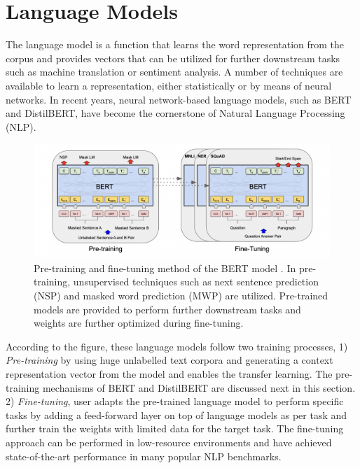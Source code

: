 \documentclass[%
	BCOR=8mm, %
	DIV=12,
	toc=bibliography, %
	toc=listof, %
	oneside, %
	egregdoesnotlikesansseriftitles, %
	]{scrbook}
\begin{document}
\section{Language Models}
\label{section:langaugemodels}
The language model is a function that learns the word representation from the corpus and provides vectors that can be utilized for further downstream tasks such as machine translation or sentiment analysis. A number of techniques are available to learn a representation, either statistically or by means of neural networks. In recent years, neural network-based language models, such as BERT and DistilBERT, have become the cornerstone of Natural Language Processing (NLP). 
\begin{figure}[H]
    \centering
    \includegraphics[width=0.8\linewidth]{img/pre_fintune.png}
    \caption[Diagram of pre-training and fine-tuning of BERT model]{ \small Pre-training and fine-tuning method of the BERT model \cite{devlin_bert_2019-1}. In pre-training, unsupervised techniques such as next sentence prediction (NSP) and masked word prediction (MWP) are utilized. Pre-trained models are provided to perform further downstream tasks and weights are further optimized during fine-tuning.}
    \label{fig:prefintune}
\end{figure}
According to the figure, these language models follow two training processes, 1)\textit{ Pre-training} by using huge unlabelled text corpora and generating a context representation vector from the model \cite{devlin_bert_2019-1}  and enables the transfer learning. The pre-training mechanisms of BERT and DistilBERT are discussed next in this section. 2) \textit{Fine-tuning}, user adapts the pre-trained language model to perform specific tasks by adding a feed-forward layer on top of language models as per task and further train the weights with limited data for the target task. The fine-tuning approach can be performed in low-resource environments and have achieved state-of-the-art performance in many popular NLP benchmarks.
\end{document}
